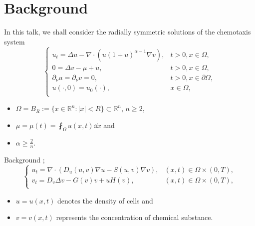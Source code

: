 \section{Background}

\begin{frame}
In this talk, we shall consider the radially symmetric solutions of the chemotaxis system
\begin{equation}\nonumber
	\left\{ \begin{array}{ll}
		u_t = \Delta u - \nabla \cdot(u(1+u)^{\alpha-1} \nabla v),&  t>0, x\in\Omega,\\
		0 =  \Delta v - \mu + u,& t>0, x\in\Omega,	\\
		\partial_\nu u = \partial_\nu v = 0 , & t >0, x\in\partial\Omega,\\
		u(\cdot, 0) = u_0(\cdot), & x\in\Omega,\\
	\end{array}
	\right.
\end{equation}
\begin{itemize}
    \item $\Omega = B_R:=\{x\in\mathbb{R}^n:|x|<R\}\subset\mathbb{R}^n$, $n\geq2$,
    \item $\mu = \mu(t) = \fint_\Omega u(x, t)\dd x$ and 
    \item $\alpha\geqslant\frac2n$.
\end{itemize}

\end{frame}


\begin{frame}{Background}
; 
\begin{equation}\label{sys: general ks}
	\begin{cases}
		u_t = \nabla\cdot(D_u(u,v)\nabla u - S(u,v)\nabla v), & (x, t)\in \Omega\times(0, T),\\
		v_t = D_v\Delta v  - G(v)v + uH(v), & (x, t)\in \Omega\times(0, T),\\
	\end{cases}
\end{equation}
\begin{itemize}
    \item $u = u(x, t)$ denotes the density of cells and 
    \item $v = v(x, t)$ represents the concentration of chemical substance.
\end{itemize}
\end{frame}


